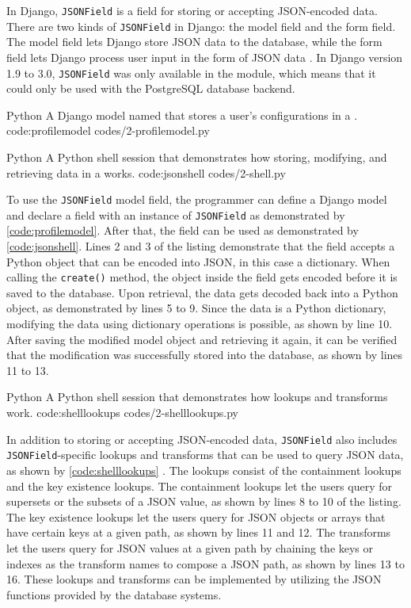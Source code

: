 In Django, \verb|JSONField| is a field for storing or accepting JSON-encoded
data. There are two kinds of \verb|JSONField| in Django: the model field and
the form field. The model field lets Django store JSON data to the database,
while the form field lets Django process user input in the form of JSON data
\cite{django30_modeljsonfield, django30_formjsonfield}. In Django version
1.9 to 3.0, \verb|JSONField| was only available in the
 module, which means that it could only be used
with the PostgreSQL database backend.

\listing
{Python}
{A Django model named  that stores a user's configurations in a
.}
{code:profilemodel}
{codes/2-profilemodel.py}

\listing
{Python}
{A Python shell session that demonstrates how storing, modifying, and
retrieving data in a  works.}
{code:jsonshell}
{codes/2-shell.py}

To use the \verb|JSONField| model field, the programmer can define a Django
model and declare a field with an instance of \verb|JSONField| as demonstrated
by \autoref{code:profilemodel}. After that, the field can be used as
demonstrated by \autoref{code:jsonshell}. Lines 2 and 3 of the listing
demonstrate that the field accepts a Python object that can be encoded into
JSON, in this case a dictionary. When calling the \verb|create()| method, the
object inside the field gets encoded before it is saved to the database. Upon
retrieval, the data gets decoded back into a Python object, as demonstrated by
lines 5 to 9. Since the data is a Python dictionary, modifying the data using
dictionary operations is possible, as shown by line 10. After saving the
modified model object and retrieving it again, it can be verified that the
modification was successfully stored into the database, as shown by lines 11 to
13.

\listing
{Python}
{A Python shell session that demonstrates how  lookups and
transforms work.}
{code:shelllookups}
{codes/2-shelllookups.py}

In addition to storing or accepting JSON-encoded data, \verb|JSONField| also
includes \verb|JSONField|-specific lookups and transforms that can be used to
query JSON data, as shown by \autoref{code:shelllookups}
\cite{django30_modeljsonfield}. The lookups consist of the containment
lookups and the key existence lookups. The containment lookups let the users
query for supersets or the subsets of a JSON value, as shown by lines 8 to 10
of the listing. The key existence lookups let the users query for JSON objects
or arrays that have certain keys at a given path, as shown by lines 11 and 12.
The transforms let the users query for JSON values at a given path by chaining
the keys or indexes as the transform names to compose a JSON path, as shown by
lines 13 to 16. These lookups and transforms can be implemented by utilizing
the JSON functions provided by the database systems.

